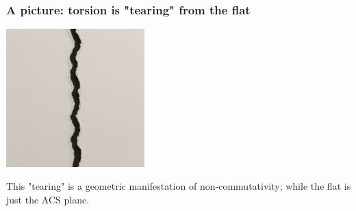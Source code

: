 \documentclass[aspectratio=169]{beamer}
\begin{document}
\begin{frame}
    \frametitle{A picture: torsion is "tearing" from the flat}
    \begin{center}
        \includegraphics[width=0.4\textwidth]{../images/tearing-paper}
    \end{center}
    \begin{center}
    This "tearing" is a geometric manifestation of non-commutativity;\newline
    while the flat is just the ACS plane.
    \end{center}
\end{frame}
\end{document}
